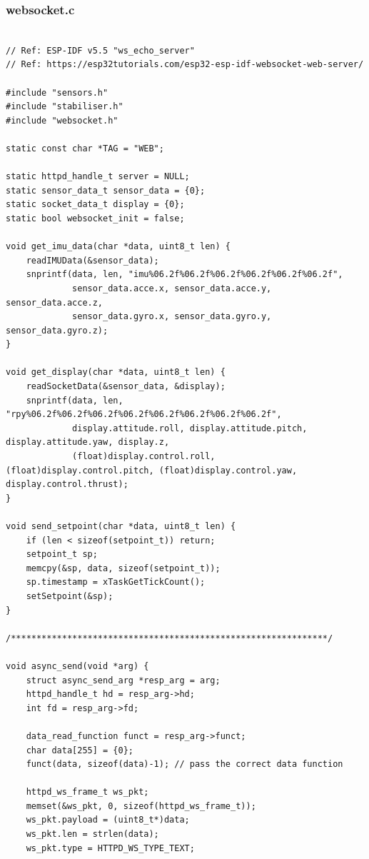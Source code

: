 \pagebreak
\subsubsection{websocket.c}

\begin{lstlisting}

// Ref: ESP-IDF v5.5 "ws_echo_server"
// Ref: https://esp32tutorials.com/esp32-esp-idf-websocket-web-server/

#include "sensors.h"
#include "stabiliser.h"
#include "websocket.h"

static const char *TAG = "WEB";

static httpd_handle_t server = NULL;
static sensor_data_t sensor_data = {0};
static socket_data_t display = {0};
static bool websocket_init = false;

void get_imu_data(char *data, uint8_t len) {
    readIMUData(&sensor_data);
    snprintf(data, len, "imu%06.2f%06.2f%06.2f%06.2f%06.2f%06.2f",
             sensor_data.acce.x, sensor_data.acce.y, sensor_data.acce.z,
             sensor_data.gyro.x, sensor_data.gyro.y, sensor_data.gyro.z);
}

void get_display(char *data, uint8_t len) {
    readSocketData(&sensor_data, &display);
    snprintf(data, len, "rpy%06.2f%06.2f%06.2f%06.2f%06.2f%06.2f%06.2f%06.2f",
             display.attitude.roll, display.attitude.pitch, display.attitude.yaw, display.z,
             (float)display.control.roll, (float)display.control.pitch, (float)display.control.yaw, display.control.thrust);
}

void send_setpoint(char *data, uint8_t len) {
    if (len < sizeof(setpoint_t)) return;
    setpoint_t sp;
    memcpy(&sp, data, sizeof(setpoint_t));
    sp.timestamp = xTaskGetTickCount();
    setSetpoint(&sp);
}

/**************************************************************/

void async_send(void *arg) {
    struct async_send_arg *resp_arg = arg;
    httpd_handle_t hd = resp_arg->hd;
    int fd = resp_arg->fd;

    data_read_function funct = resp_arg->funct; 
    char data[255] = {0};
    funct(data, sizeof(data)-1); // pass the correct data function

    httpd_ws_frame_t ws_pkt;
    memset(&ws_pkt, 0, sizeof(httpd_ws_frame_t));
    ws_pkt.payload = (uint8_t*)data;
    ws_pkt.len = strlen(data);
    ws_pkt.type = HTTPD_WS_TYPE_TEXT;


\end{lstlisting}
